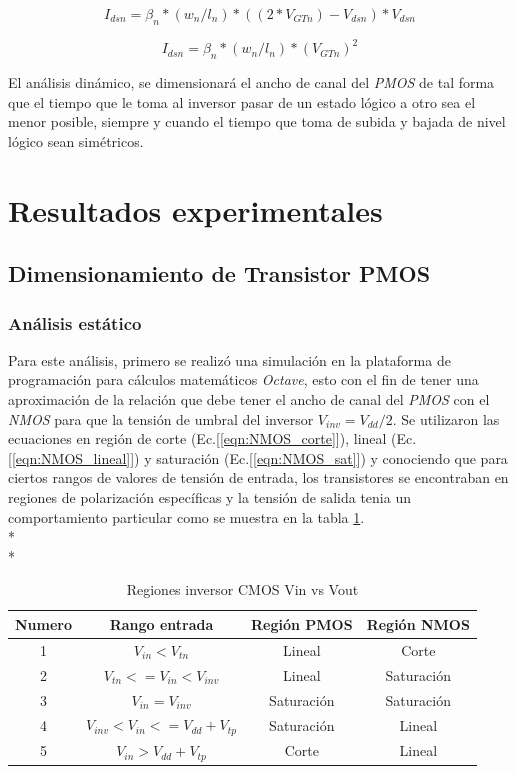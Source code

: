 \documentclass[12pt,a4paper]{article} %
\begin{document}
\begin{equation}\label{eqn:NMOS_lineal}
I_{dsn}=\beta_{n}*(w_{n}/l_{n})*((2*V_{GTn})-V_{dsn})*V_{dsn}
\end{equation}

\begin{equation}\label{eqn:NMOS_sat}
I_{dsn}=\beta_{n}*(w_{n}/l_{n})*(V_{GTn})^2
\end{equation}

El análisis dinámico, se dimensionará el ancho de canal del \textit{PMOS} de tal forma que el tiempo que le toma al inversor pasar de un estado lógico a otro sea el menor posible, siempre y cuando el tiempo que toma de subida y bajada de nivel lógico sean simétricos.

\section{Resultados experimentales}


\subsection{Dimensionamiento de Transistor PMOS}

\subsubsection{Análisis estático}


Para este análisis, primero se realizó una simulación en la plataforma de programación para cálculos matemáticos \textit{Octave}, esto con el fin de tener una aproximación de la relación que debe tener el ancho de canal del \textit{PMOS} con el \textit{NMOS} para que la tensión de umbral del inversor $V_{inv}=V_{dd}/2$. Se utilizaron las ecuaciones en región de corte (Ec.[\ref{eqn:NMOS_corte}]), lineal (Ec.[\ref{eqn:NMOS_lineal}]) y saturación (Ec.[\ref{eqn:NMOS_sat}]) y conociendo que para ciertos rangos de valores de tensión de entrada, los transistores se encontraban en regiones de polarización específicas y la tensión de salida tenia un comportamiento particular como se muestra en la tabla \ref{table:Tabla_polarizacion}.\\*
\\*

\begin{table}\label{table:Tabla_polarizacion}
\begin{center}
\begin{tabular}{c||c||c||c}
Numero & Rango entrada & Región PMOS & Región NMOS\\
\hline
\hline
1 & $V_{in}<V_{tn}$ & Lineal & Corte \\
2 & $V_{tn}<=V_{in}<V_{inv}$ & Lineal & Saturación \\
3 & $V_{in}=V_{inv}$ & Saturación & Saturación\\
4 & $V_{inv}<V_{in}<=V_{dd}+V_{tp}$ & Saturación & Lineal\\
5 & $V_{in}>V_{dd}+V_{tp}$ & Corte & Lineal\\
\hline
\end{tabular}
\caption{Regiones inversor CMOS Vin vs Vout}
\end{center}
\end{table}
\end{document}

